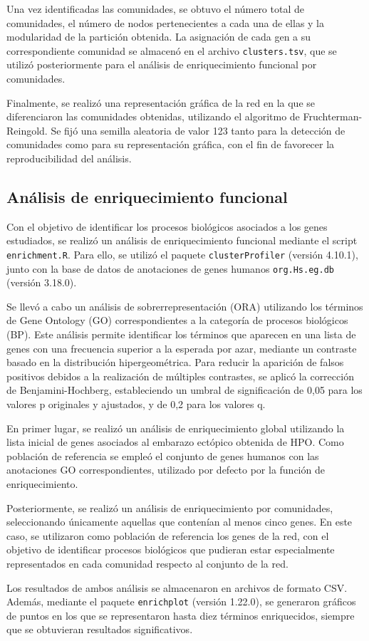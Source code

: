 Una vez identificadas las comunidades, se obtuvo el número total de comunidades, el número de nodos pertenecientes a cada una de ellas y la modularidad de la partición obtenida. La asignación de cada gen a su correspondiente comunidad se almacenó en el archivo \texttt{clusters.tsv}, que se utilizó posteriormente para el análisis de enriquecimiento funcional por comunidades.

Finalmente, se realizó una representación gráfica de la red en la que se diferenciaron las comunidades obtenidas, utilizando el algoritmo de Fruchterman-Reingold. Se fijó una semilla aleatoria de valor 123 tanto para la detección de comunidades como para su representación gráfica, con el fin de favorecer la reproducibilidad del análisis.

\subsection{Análisis de enriquecimiento funcional}

Con el objetivo de identificar los procesos biológicos asociados a los genes estudiados, se realizó un análisis de enriquecimiento funcional mediante el script \texttt{enrichment.R}. Para ello, se utilizó el paquete \texttt{clusterProfiler} (versión 4.10.1), junto con la base de datos de anotaciones de genes humanos \texttt{org.Hs.eg.db} (versión 3.18.0).

Se llevó a cabo un análisis de sobrerrepresentación (ORA) utilizando los términos de Gene Ontology (GO) correspondientes a la categoría de procesos biológicos (BP). Este análisis permite identificar los términos que aparecen en una lista de genes con una frecuencia superior a la esperada por azar, mediante un contraste basado en la distribución hipergeométrica. Para reducir la aparición de falsos positivos debidos a la realización de múltiples contrastes, se aplicó la corrección de Benjamini-Hochberg, estableciendo un umbral de significación de 0,05 para los valores p originales y ajustados, y de 0,2 para los valores q.

En primer lugar, se realizó un análisis de enriquecimiento global utilizando la lista inicial de genes asociados al embarazo ectópico obtenida de HPO. Como población de referencia se empleó el conjunto de genes humanos con las anotaciones GO correspondientes, utilizado por defecto por la función de enriquecimiento.

Posteriormente, se realizó un análisis de enriquecimiento por comunidades, seleccionando únicamente aquellas que contenían al menos cinco genes. En este caso, se utilizaron como población de referencia los genes de la red, con el objetivo de identificar procesos biológicos que pudieran estar especialmente representados en cada comunidad respecto al conjunto de la red.

Los resultados de ambos análisis se almacenaron en archivos de formato CSV. Además, mediante el paquete \texttt{enrichplot} (versión 1.22.0), se generaron gráficos de puntos en los que se representaron hasta diez términos enriquecidos, siempre que se obtuvieran resultados significativos.